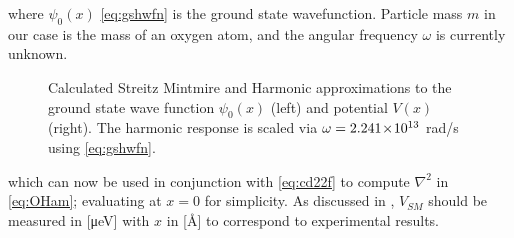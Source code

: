 where $\psi_0(x)$ \cref{eq:gshwfn} is the ground state wavefunction. Particle mass $m$ in our case is the mass of an oxygen atom, and the angular frequency $\omega$ is currently unknown.

\begin{figure}[htp]
\centering
\resizebox{\widefigure}{!}{}
\parbox{\widefigure}{\caption[Harmonic Approximation to Strietz Mintmire]{\label{fig:smvh}Calculated Streitz Mintmire  and Harmonic approximations  to the ground state wave function $\psi_0(x)$ (left) and potential $V(x)$ (right). The harmonic response is scaled via $\omega = 2.241\!\times\!10^{13}$ rad/s using \cref{eq:gshwfn}.}}
\end{figure}

which can now be used in conjunction with \cref{eq:cd22f} to compute $\nabla^2$ in \cref{eq:OHam}; evaluating at $x = 0$ for simplicity.
As discussed in , $V_{SM}$ should be measured in [μeV] with $x$ in [Å] to correspond to experimental results.

